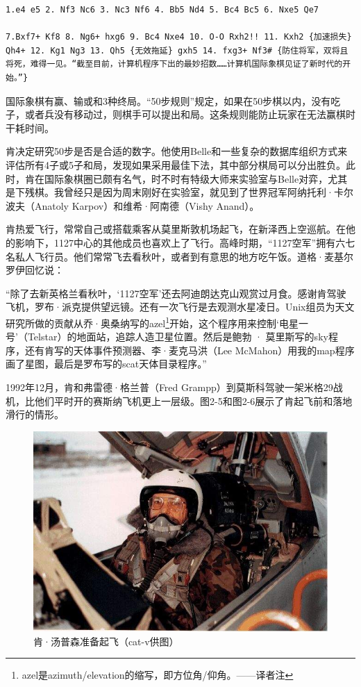 \documentclass[a4paper,12pt,UTF8,twoside]{ctexbook}
\begin{document}
\begin{lstlisting}
1.e4 e5 2. Nf3 Nc6 3. Nc3 Nf6 4. Bb5 Nd4 5. Bc4 Bc5 6. Nxe5 Qe7

7.Bxf7+ Kf8 8. Ng6+ hxg6 9. Bc4 Nxe4 10. O-O Rxh2!! 11. Kxh2 {加速损失} Qh4+ 12. Kg1 Ng3 13. Qh5 {无效拖延} gxh5 14. fxg3+ Nf3# {防住将军，双将且将死，难得一见。“截至目前，计算机程序下出的最妙招数……计算机国际象棋见证了新时代的开始。”}
\end{lstlisting}

国际象棋有赢、输或和3种终局。“50步规则”规定，如果在50步棋以内，没有吃子，或者兵没有移动过，则棋手可以提出和局。这条规则能防止玩家在无法赢棋时干耗时间。

肯决定研究50步是否是合适的数字。他使用Belle和一些复杂的数据库组织方式来评估所有4子或5子和局，发现如果采用最佳下法，其中部分棋局可以分出胜负。此时，肯在国际象棋圈已颇有名气，时不时有特级大师来实验室与Belle对弈，尤其是下残棋。我曾经只是因为周末刚好在实验室，就见到了世界冠军阿纳托利·卡尔波夫（Anatoly Karpov）和维希·阿南德（Vishy Anand）。

肯热爱飞行，常常自己或搭载乘客从莫里斯敦机场起飞，在新泽西上空巡航。在他的影响下，1127中心的其他成员也喜欢上了飞行。高峰时期，“1127空军”拥有六七名私人飞行员。他们常常飞去看秋叶，或者到有意思的地方吃午饭。道格·麦基尔罗伊回忆说：

“除了去新英格兰看秋叶，‘1127空军’还去阿迪朗达克山观赏过月食。感谢肯驾驶飞机，罗布·派克提供望远镜。还有一次飞行是去观测水星凌日。Unix组员为天文研究所做的贡献从乔·奥桑纳写的azel\footnote{azel是azimuth/elevation的缩写，即方位角/仰角。——译者注}开始，这个程序用来控制‘电星一号’（Telstar）的地面站，追踪人造卫星位置。然后是鲍勃 · 莫里斯写的sky程序，还有肯写的天体事件预测器、李·麦克马洪（Lee McMahon）用我的map程序画了星图，最后是罗布写的scat天体目录程序。”

1992年12月，肯和弗雷德·格兰普（Fred Grampp）到莫斯科驾驶一架米格29战机，比他们平时开的赛斯纳飞机更上一层级。图2-5和图2-6展示了肯起飞前和落地滑行的情形。

\begin{figure}[htbp]
	\centering
	\includegraphics[width=0.7\linewidth]{17}
	\caption{肯·汤普森准备起飞（cat-v供图）}
	\label{fig:1}
\end{figure}
\end{document}
